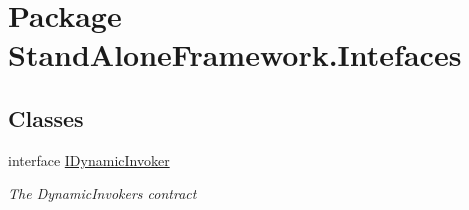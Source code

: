 \hypertarget{namespace_stand_alone_framework_1_1_intefaces}{\section{Package Stand\+Alone\+Framework.\+Intefaces}
\label{namespace_stand_alone_framework_1_1_intefaces}
}
\subsection*{Classes}
\begin{DoxyCompactItemize}
\item 
interface \hyperlink{interface_stand_alone_framework_1_1_intefaces_1_1_i_dynamic_invoker}{I\+Dynamic\+Invoker}
\begin{DoxyCompactList}\small\item\em The Dynamic\+Invokers contract \end{DoxyCompactList}\end{DoxyCompactItemize}
